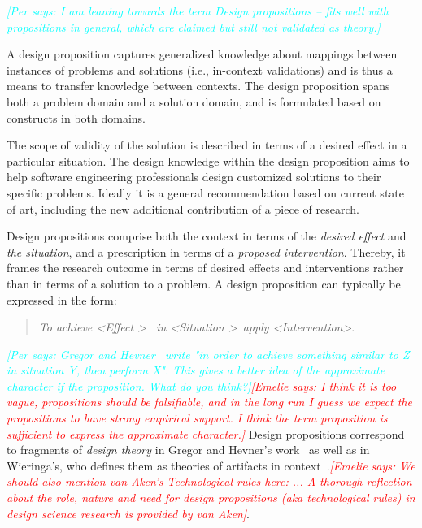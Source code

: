 \documentclass[graybox]{svmult}
\newcommand{\emelie}[1]{\textcolor{red}{{\it [Emelie says: #1]}}}
\newcommand{\per}[1]{\textcolor{cyan}{{\it [Per says: #1]}}}
\newcommand{\emelie}[1]{}
\newcommand{\per}[1]{}
\begin{document}
\per{I am leaning towards the term Design propositions -- fits well with propositions in general, which are claimed but still not validated as theory.}

A design proposition captures generalized knowledge about mappings between instances of problems and solutions (i.e., in-context validations) and is thus a means to transfer knowledge between contexts. The design proposition spans both a problem domain and a solution domain, and is formulated based on constructs in both domains. 

The scope of validity of the solution is described in terms of a desired effect in a particular situation.   The design knowledge within the design proposition aims to help software engineering professionals design customized solutions to their specific problems. Ideally it is a general recommendation based on current state of art, including the new additional contribution of a piece of research.

Design propositions comprise both the context in terms of the \emph{desired effect} and \emph{the situation}, and a prescription in terms of a \emph{proposed intervention}. Thereby, it frames the research outcome in terms of desired effects and interventions rather than in terms of a solution to a problem. A design proposition can typically be expressed in the form: 

\begin{quote}{\emph{To achieve \textless Effect \textgreater ~ in \textless Situation \textgreater~apply \textless Intervention\textgreater}.} 
\end{quote}
\per{ Gregor and Hevner~\cite{gregor_positioning_2013} write "in order to achieve something \emph{similar to} Z in situation Y, then perform X". This gives a better idea of the approximate character if the proposition. What do you think?}\emelie{I think it is too vague, propositions should be falsifiable, and in the long run I guess we expect the propositions to have strong empirical support. I think the term proposition is sufficient to express the approximate character.}
Design propositions correspond to fragments of \emph{design theory} in Gregor and Hevner's work~\cite{gregor_positioning_2013} as well as in Wieringa's, who defines them as theories of artifacts in context~\cite{wieringa_design_2009}.\emelie{We should also mention van Aken's Technological rules here: ... A thorough reflection about the role, nature and need for design propositions (aka technological rules) in design science research is provided by van Aken\cite{van_aken_management_2004}}.
\end{document}
